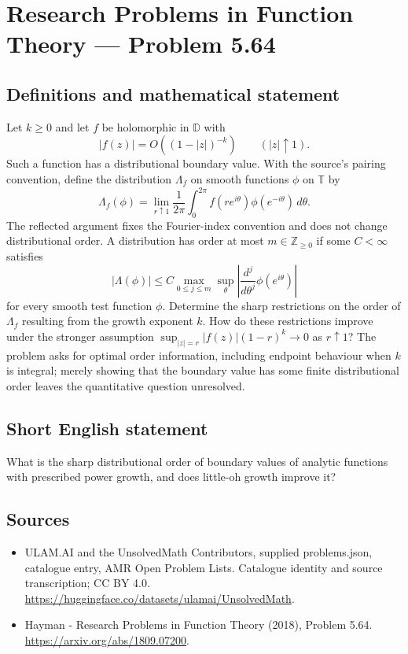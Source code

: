 \documentclass[11pt,a4paper]{article}
\begin{document}
\section*{Research Problems in Function Theory — Problem 5.64}\label{statement}

\subsection{Definitions and mathematical statement}
Let $k\ge0$ and let $f$ be holomorphic in $\mathbb D$ with
\[
|f(z)|=O((1-|z|)^{-k})\qquad(|z|\uparrow1).
\]
Such a function has a distributional boundary value. With the source's pairing convention, define the distribution $\Lambda_f$ on smooth functions $\phi$ on $\mathbb T$ by
\[
\Lambda_f(\phi)=\lim_{r\uparrow1}\frac1{2\pi}
\int_0^{2\pi}f(re^{i\theta})\phi(e^{-i\theta})\,d\theta.
\]
The reflected argument fixes the Fourier-index convention and does not change distributional order. A distribution has order at most $m\in\mathbb Z_{\ge0}$ if some $C<\infty$ satisfies
\[
|\Lambda(\phi)|\le C\max_{0\le j\le m}
\sup_\theta\left|\frac{d^j}{d\theta^j}\phi(e^{i\theta})\right|
\]
for every smooth test function $\phi$.
Determine the sharp restrictions on the order of $\Lambda_f$ resulting from the growth exponent $k$. How do these restrictions improve under the stronger assumption
$\sup_{|z|=r}|f(z)|(1-r)^k\to0$ as $r\uparrow1$?
The problem asks for optimal order information, including endpoint behaviour when $k$ is integral; merely showing that the boundary value has some finite distributional order leaves the quantitative question unresolved.
\subsection{Short English statement}
What is the sharp distributional order of boundary values of analytic functions with prescribed power growth, and does little-oh growth improve it?
\subsection{Sources}
\begin{itemize}
\item[S1] ULAM.AI and the UnsolvedMath Contributors, supplied problems.json, catalogue entry, AMR Open Problem Lists. Catalogue identity and source transcription; CC BY 4.0.
\url{https://huggingface.co/datasets/ulamai/UnsolvedMath}.
\item[S2] Hayman - Research Problems in Function Theory (2018), Problem 5.64. 
\url{https://arxiv.org/abs/1809.07200}.
\end{itemize}
\end{document}
